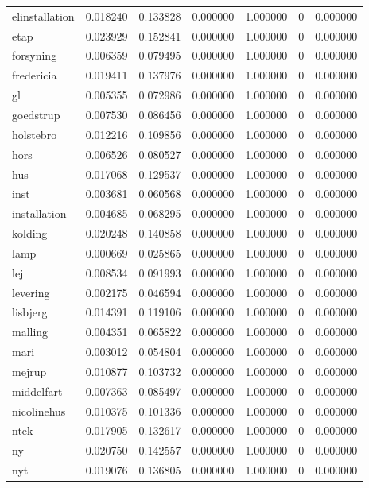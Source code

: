 \begin{landscape}
\begin{longtable}[h!]{lrrllrr}
elinstallation & 0.018240 & 0.133828 & 0.000000 & 1.000000 & 0 & 0.000000 \\
etap & 0.023929 & 0.152841 & 0.000000 & 1.000000 & 0 & 0.000000 \\
forsyning & 0.006359 & 0.079495 & 0.000000 & 1.000000 & 0 & 0.000000 \\
fredericia & 0.019411 & 0.137976 & 0.000000 & 1.000000 & 0 & 0.000000 \\
gl & 0.005355 & 0.072986 & 0.000000 & 1.000000 & 0 & 0.000000 \\
goedstrup & 0.007530 & 0.086456 & 0.000000 & 1.000000 & 0 & 0.000000 \\
holstebro & 0.012216 & 0.109856 & 0.000000 & 1.000000 & 0 & 0.000000 \\
hors & 0.006526 & 0.080527 & 0.000000 & 1.000000 & 0 & 0.000000 \\
hus & 0.017068 & 0.129537 & 0.000000 & 1.000000 & 0 & 0.000000 \\
inst & 0.003681 & 0.060568 & 0.000000 & 1.000000 & 0 & 0.000000 \\
installation & 0.004685 & 0.068295 & 0.000000 & 1.000000 & 0 & 0.000000 \\
kolding & 0.020248 & 0.140858 & 0.000000 & 1.000000 & 0 & 0.000000 \\
lamp & 0.000669 & 0.025865 & 0.000000 & 1.000000 & 0 & 0.000000 \\
lej & 0.008534 & 0.091993 & 0.000000 & 1.000000 & 0 & 0.000000 \\
levering & 0.002175 & 0.046594 & 0.000000 & 1.000000 & 0 & 0.000000 \\
lisbjerg & 0.014391 & 0.119106 & 0.000000 & 1.000000 & 0 & 0.000000 \\
malling & 0.004351 & 0.065822 & 0.000000 & 1.000000 & 0 & 0.000000 \\
mari & 0.003012 & 0.054804 & 0.000000 & 1.000000 & 0 & 0.000000 \\
mejrup & 0.010877 & 0.103732 & 0.000000 & 1.000000 & 0 & 0.000000 \\
middelfart & 0.007363 & 0.085497 & 0.000000 & 1.000000 & 0 & 0.000000 \\
nicolinehus & 0.010375 & 0.101336 & 0.000000 & 1.000000 & 0 & 0.000000 \\
ntek & 0.017905 & 0.132617 & 0.000000 & 1.000000 & 0 & 0.000000 \\
ny & 0.020750 & 0.142557 & 0.000000 & 1.000000 & 0 & 0.000000 \\
nyt & 0.019076 & 0.136805 & 0.000000 & 1.000000 & 0 & 0.000000 \\

\end{longtable}
\end{landscape}

